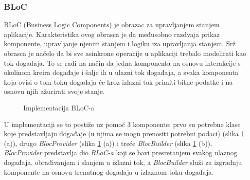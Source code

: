 \documentclass[times, utf8, zavrsni]{fer}
\begin{document}
\subsubsection{BLoC}
BLoC (Business Logic Components) je obrazac za upravljanjem stanjem aplikacije. Karakteristika ovog obrasca
je da međusobno razdvaja prikaz komponente, upravljanje njenim stanjem i logiku iza upravljanja stanjem.
Srž obrasca je načelo da bi sve asinkrone operacije u aplikaciji trebalo modelirati kao tok događaja. To se
radi na način da jedna komponenta
na osnovu interakcije s okolinom kreira događaje i šalje ih u ulazni tok događaja, a svaka komponenta koja
ovisi o tom toku događaja će kroz izlazni tok primiti bitne podatke i na osnovu njih ažurirati svoje stanje.
\begin{figure}[h]
      \centering
      \caption{Implementacija BLoC-a}
      \label{fig:BLoC}
\end{figure}
U implementaciji se to postiže uz pomoć 3 komponente: prvo su potrebne klase koje predstavljaju događaje (u njima se mogu prenositi
potrebni podaci) (slika \ref{fig:BLoC} (a)), drugo \textit{BlocProvider} (slika \ref{fig:BLoC} (a))
i treće \textit{BlocBuilder} (slika \ref{fig:BLoC} (b)). \textit{BlocProvider} predstavlja dio \textit{BLoC-a}
koji se bavi presretanjem svakog ulaznog događaja, obrađivanjem i slanjem u izlazni tok, a \textit{BlocBuilder}
služi za izgradnju komponente na osnovu trenutnog događaja u izlaznom toku događaja.
\end{document}
